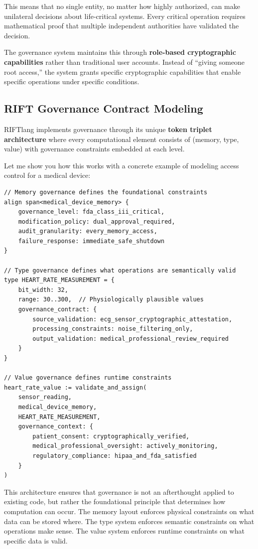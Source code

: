 This means that no single entity, no matter how highly authorized, can make unilateral decisions about life-critical systems. Every critical operation requires mathematical proof that multiple independent authorities have validated the decision.

The governance system maintains this through \textbf{role-based cryptographic capabilities} rather than traditional user accounts. Instead of ``giving someone root access,'' the system grants specific cryptographic capabilities that enable specific operations under specific conditions.

\subsection{RIFT Governance Contract Modeling}

RIFTlang implements governance through its unique \textbf{token triplet architecture} where every computational element consists of (memory, type, value) with governance constraints embedded at each level.

Let me show you how this works with a concrete example of modeling access control for a medical device:

\begin{lstlisting}[language=rift]
// Memory governance defines the foundational constraints
align span<medical_device_memory> {
    governance_level: fda_class_iii_critical,
    modification_policy: dual_approval_required,
    audit_granularity: every_memory_access,
    failure_response: immediate_safe_shutdown
}

// Type governance defines what operations are semantically valid
type HEART_RATE_MEASUREMENT = {
    bit_width: 32,
    range: 30..300,  // Physiologically plausible values
    governance_contract: {
        source_validation: ecg_sensor_cryptographic_attestation,
        processing_constraints: noise_filtering_only,
        output_validation: medical_professional_review_required
    }
}

// Value governance defines runtime constraints
heart_rate_value := validate_and_assign(
    sensor_reading,
    medical_device_memory,
    HEART_RATE_MEASUREMENT,
    governance_context: {
        patient_consent: cryptographically_verified,
        medical_professional_oversight: actively_monitoring,
        regulatory_compliance: hipaa_and_fda_satisfied
    }
)
\end{lstlisting}

This architecture ensures that governance is not an afterthought applied to existing code, but rather the foundational principle that determines how computation can occur. The memory layout enforces physical constraints on what data can be stored where. The type system enforces semantic constraints on what operations make sense. The value system enforces runtime constraints on what specific data is valid.

